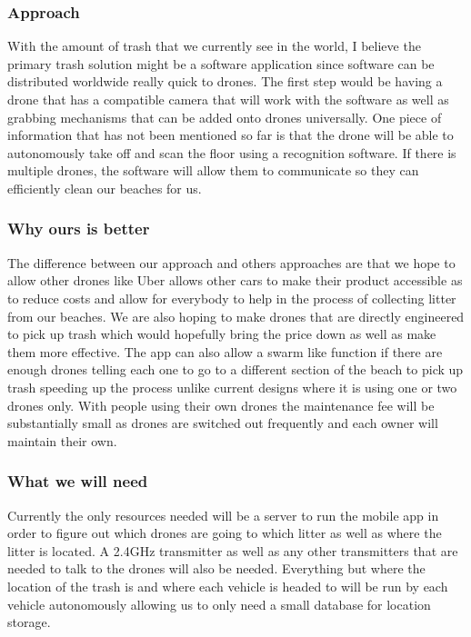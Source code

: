\documentclass[12pt]{article}
\begin{document}
\subsubsection{Approach}
With the amount of trash that we currently see in the world, I believe the primary trash solution might be a software application since software can be distributed worldwide really quick to drones. The first step would be having a drone that has a compatible camera that will work with the software as well as grabbing mechanisms that can be added onto drones universally. One piece of information that has not been mentioned so far is that the drone will be able to autonomously take off and scan the floor using a recognition software. If there is multiple drones, the software will allow them to communicate so they can efficiently clean our beaches for us. 
\newline
\newline

\subsubsection{Why ours is better}
The difference between our approach and others approaches are that we hope to allow other drones like Uber allows other cars to make their product accessible as to reduce costs and allow for everybody to help in the process of collecting litter from our beaches. We are also hoping to make drones that are directly engineered to pick up trash which would hopefully bring the price down as well as make them more effective. The app can also allow a swarm like function if there are enough drones telling each one to go to a different section of the beach to pick up trash speeding up the process unlike current designs where it is using one or two drones only. With people using their own drones the maintenance fee will be substantially small as drones are switched out frequently and each owner will maintain their own.
\newline
\newline

\subsubsection{What we will need}
Currently the only resources needed will be a server to run the mobile app in order to figure out which drones are going to which litter as well as where the litter is located. A 2.4GHz transmitter as well as any other transmitters that are needed to talk to the drones will also be needed. Everything but where the location of the trash is and where each vehicle is headed to will be run by each vehicle autonomously allowing us to only need a small database for location storage.
\newline
\newline
\end{document}
